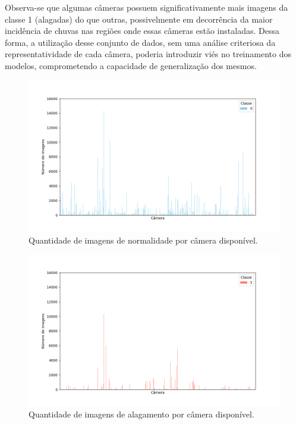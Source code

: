 Observa-se que algumas câmeras possuem significativamente mais imagens da classe 1 (alagadas) do que outras, possivelmente em decorrência da maior incidência de chuvas nas regiões onde essas câmeras estão instaladas.
Dessa forma, a utilização desse conjunto de dados, sem uma análise criteriosa da representatividade de cada câmera, poderia introduzir viés no treinamento dos modelos, comprometendo a capacidade de generalização dos mesmos.
\begin{figure}[htb]
    \centerline{\includegraphics[width=1\linewidth]{images/metodologia/class_0_count_code.png}}
    \caption{Quantidade de imagens de normalidade por câmera disponível.}
    \label{fig:class0count}
\end{figure}

\begin{figure}[htb]
    \centerline{\includegraphics[width=1\linewidth]{images/metodologia/class_1_count_code.png}}
    \caption{Quantidade de imagens de alagamento por câmera disponível.}
    \label{fig:class1count}
\end{figure}

